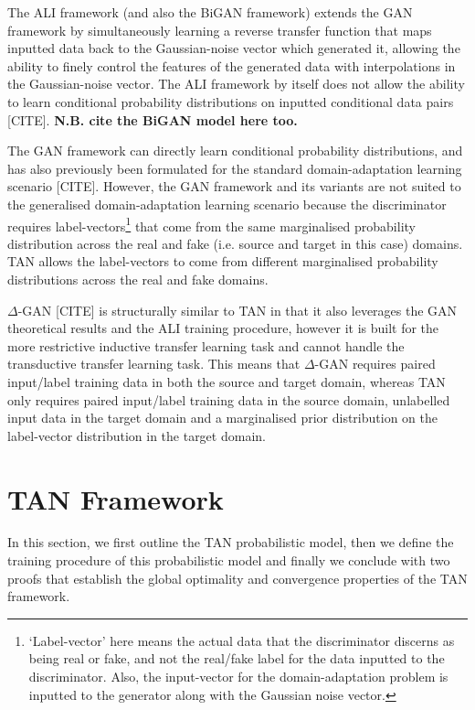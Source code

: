 \documentclass{article}
\begin{document}
The ALI framework (and also the BiGAN framework) extends the GAN framework by simultaneously learning a reverse transfer function that maps inputted data back to the Gaussian-noise vector which generated it, allowing the ability to finely control the features of the generated data with interpolations in the Gaussian-noise vector. The ALI framework by itself does not allow the ability to learn conditional probability distributions on inputted conditional data pairs [CITE]. \textbf{N.B. cite the BiGAN model here too. }

The GAN framework can directly learn conditional probability distributions, and has also previously been formulated for the standard domain-adaptation learning scenario [CITE]. However, the GAN framework and its variants are not suited to the generalised domain-adaptation learning scenario because the discriminator requires label-vectors\footnote{`Label-vector' here means the actual data that the discriminator discerns as being real or fake, and not the real/fake label for the data inputted to the discriminator. Also, the input-vector for the domain-adaptation problem is inputted to the generator along with the Gaussian noise vector.} that come from the same marginalised probability distribution across the real and fake (i.e. source and target in this case) domains. TAN allows the label-vectors to come from different marginalised probability distributions across the real and fake domains.

$\Delta$-GAN [CITE] is structurally similar to TAN in that it also leverages the GAN theoretical results and the ALI training procedure, however it is built for the more restrictive inductive transfer learning task and cannot handle the transductive transfer learning task. This means that $\Delta$-GAN requires paired input/label training data in both the source and target domain, whereas TAN only requires paired input/label training data in the source domain, unlabelled input data in the target domain and a marginalised prior distribution on the label-vector distribution in the target domain.

\section{TAN Framework}
In this section, we first outline the TAN probabilistic model, then we define the training procedure of this probabilistic model and finally we conclude with two proofs that establish the global optimality and convergence properties of the TAN framework. 
\end{document}
